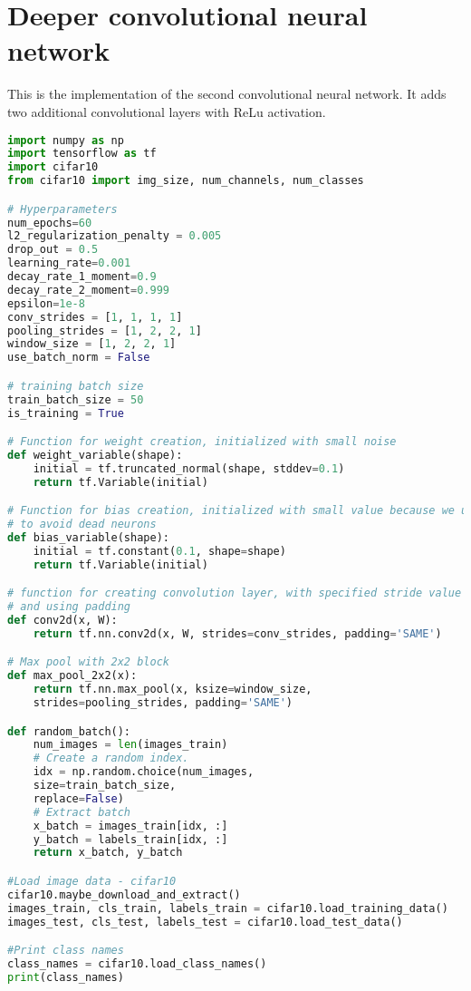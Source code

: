 \chapter{Deeper convolutional neural network}

This is the implementation of the second convolutional neural network. It adds two additional convolutional layers with ReLu activation.

\begin{lstlisting}[language=Python, label=lst:neuralnet.py, caption={neural\_net.py}, basicstyle=\tiny]
import numpy as np
import tensorflow as tf
import cifar10
from cifar10 import img_size, num_channels, num_classes

# Hyperparameters
num_epochs=60
l2_regularization_penalty = 0.005
drop_out = 0.5
learning_rate=0.001
decay_rate_1_moment=0.9
decay_rate_2_moment=0.999
epsilon=1e-8
conv_strides = [1, 1, 1, 1]
pooling_strides = [1, 2, 2, 1]
window_size = [1, 2, 2, 1]
use_batch_norm = False

# training batch size
train_batch_size = 50
is_training = True

# Function for weight creation, initialized with small noise
def weight_variable(shape):
	initial = tf.truncated_normal(shape, stddev=0.1)
	return tf.Variable(initial)

# Function for bias creation, initialized with small value because we use relu
# to avoid dead neurons
def bias_variable(shape):
	initial = tf.constant(0.1, shape=shape)
	return tf.Variable(initial)

# function for creating convolution layer, with specified stride value
# and using padding
def conv2d(x, W):
	return tf.nn.conv2d(x, W, strides=conv_strides, padding='SAME')

# Max pool with 2x2 block
def max_pool_2x2(x):
	return tf.nn.max_pool(x, ksize=window_size,
	strides=pooling_strides, padding='SAME')

def random_batch():
	num_images = len(images_train)
	# Create a random index.
	idx = np.random.choice(num_images,
	size=train_batch_size,
	replace=False)
	# Extract batch                           
	x_batch = images_train[idx, :]
	y_batch = labels_train[idx, :]
	return x_batch, y_batch

#Load image data - cifar10
cifar10.maybe_download_and_extract()
images_train, cls_train, labels_train = cifar10.load_training_data()
images_test, cls_test, labels_test = cifar10.load_test_data()

#Print class names
class_names = cifar10.load_class_names()
print(class_names)


\end{lstlisting}
